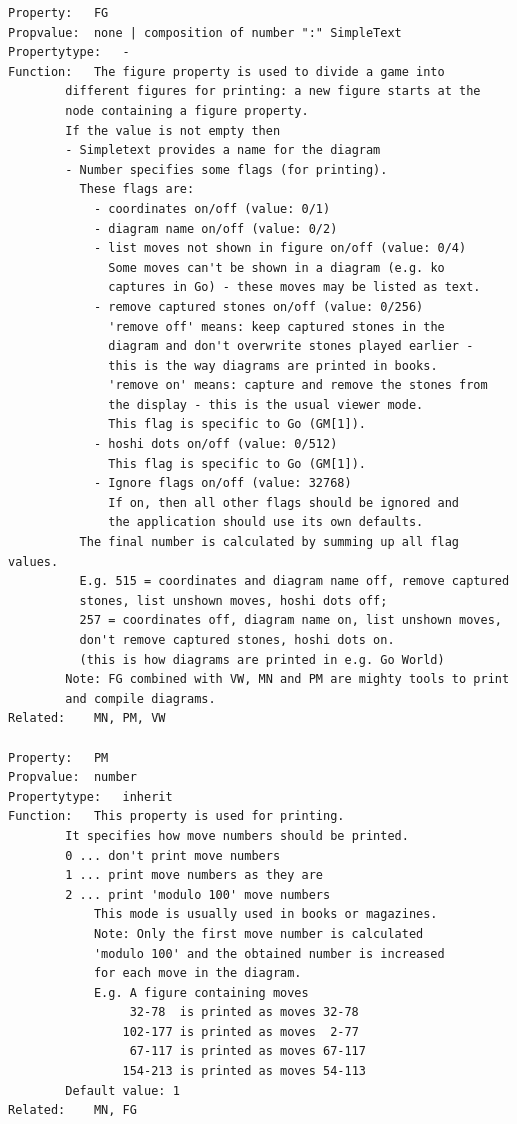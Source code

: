 \begin{verbatim}
Property:   FG
Propvalue:  none | composition of number ":" SimpleText
Propertytype:   -
Function:   The figure property is used to divide a game into
        different figures for printing: a new figure starts at the
        node containing a figure property.
        If the value is not empty then
        - Simpletext provides a name for the diagram
        - Number specifies some flags (for printing).
          These flags are:
            - coordinates on/off (value: 0/1)
            - diagram name on/off (value: 0/2)
            - list moves not shown in figure on/off (value: 0/4)
              Some moves can't be shown in a diagram (e.g. ko
              captures in Go) - these moves may be listed as text.
            - remove captured stones on/off (value: 0/256)
              'remove off' means: keep captured stones in the
              diagram and don't overwrite stones played earlier -
              this is the way diagrams are printed in books.
              'remove on' means: capture and remove the stones from
              the display - this is the usual viewer mode.
              This flag is specific to Go (GM[1]).
            - hoshi dots on/off (value: 0/512)
              This flag is specific to Go (GM[1]).
            - Ignore flags on/off (value: 32768)
              If on, then all other flags should be ignored and
              the application should use its own defaults.
          The final number is calculated by summing up all flag values.
          E.g. 515 = coordinates and diagram name off, remove captured
          stones, list unshown moves, hoshi dots off;
          257 = coordinates off, diagram name on, list unshown moves,
          don't remove captured stones, hoshi dots on.
          (this is how diagrams are printed in e.g. Go World)
        Note: FG combined with VW, MN and PM are mighty tools to print
        and compile diagrams.
Related:    MN, PM, VW

Property:   PM
Propvalue:  number
Propertytype:   inherit
Function:   This property is used for printing.
        It specifies how move numbers should be printed.
        0 ... don't print move numbers
        1 ... print move numbers as they are
        2 ... print 'modulo 100' move numbers
            This mode is usually used in books or magazines.
            Note: Only the first move number is calculated
            'modulo 100' and the obtained number is increased
            for each move in the diagram.
            E.g. A figure containing moves
                 32-78  is printed as moves 32-78
                102-177 is printed as moves  2-77
                 67-117 is printed as moves 67-117
                154-213 is printed as moves 54-113
        Default value: 1
Related:    MN, FG


\end{verbatim}

